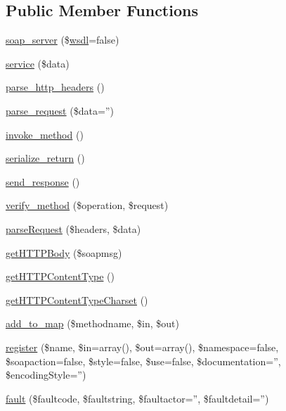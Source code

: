 \subsection*{Public Member Functions}
\begin{DoxyCompactItemize}
\item 
\hyperlink{classsoap__server_a190cf678e3d912843f6e7442c25b5ccb}{soap\-\_\-server} (\$\hyperlink{classwsdl}{wsdl}=false)
\item 
\hyperlink{classsoap__server_ad91e2ca0020e1192392077915db92e41}{service} (\$data)
\item 
\hyperlink{classsoap__server_aa7d62dcdbc6b24667691c66700bec2ea}{parse\-\_\-http\-\_\-headers} ()
\item 
\hyperlink{classsoap__server_ac1c98672ed25f0f3b8a7470a342f45c0}{parse\-\_\-request} (\$data='')
\item 
\hyperlink{classsoap__server_afa0f240a77cba882ddb1096255aaa88c}{invoke\-\_\-method} ()
\item 
\hyperlink{classsoap__server_a2d107db4f89e00b4028dbfb2827c40dd}{serialize\-\_\-return} ()
\item 
\hyperlink{classsoap__server_a5639906d44165650fa1ee610f2435e89}{send\-\_\-response} ()
\item 
\hyperlink{classsoap__server_a6621bf070937d91b20824bceedac26f4}{verify\-\_\-method} (\$operation, \$request)
\item 
\hyperlink{classsoap__server_a7a69990540b6dc277f2775abd40772a1}{parse\-Request} (\$headers, \$data)
\item 
\hyperlink{classsoap__server_ab1e22b0858bdbe61d2d711ff442c0e78}{get\-H\-T\-T\-P\-Body} (\$soapmsg)
\item 
\hyperlink{classsoap__server_a2bed19ef2d537dee244535339cd6026a}{get\-H\-T\-T\-P\-Content\-Type} ()
\item 
\hyperlink{classsoap__server_a9051db33a9b7e50315d9222ef1c52ce9}{get\-H\-T\-T\-P\-Content\-Type\-Charset} ()
\item 
\hyperlink{classsoap__server_ad2e47223401828fb5e5fe54733abaf9a}{add\-\_\-to\-\_\-map} (\$methodname, \$in, \$out)
\item 
\hyperlink{classsoap__server_a17b5ba99bab794b0a9584592f6e23b04}{register} (\$name, \$in=array(), \$out=array(), \$namespace=false, \$soapaction=false, \$style=false, \$use=false, \$documentation='', \$encoding\-Style='')
\item 
\hyperlink{classsoap__server_ac6a9b7aaeeeecd1e365f8846d4bfc2d9}{fault} (\$faultcode, \$faultstring, \$faultactor='', \$faultdetail='')

\end{DoxyCompactItemize}
